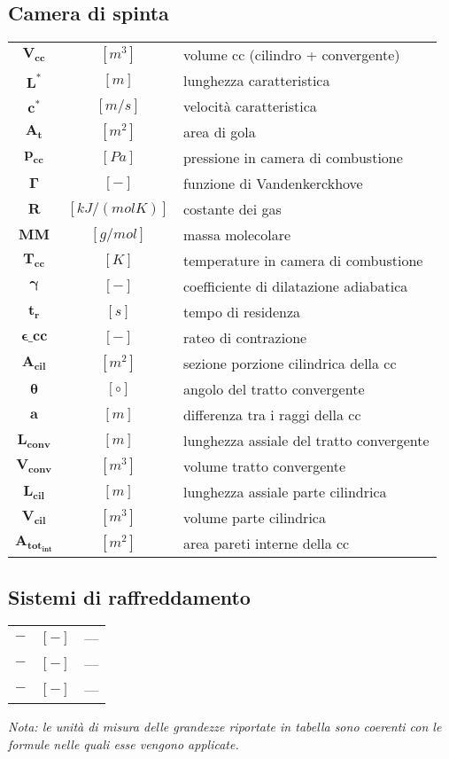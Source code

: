 \begin{multicols}{2}
	\subsection{Camera di spinta}
	\begin{tabular}{ccl}
		$\bm{V_{cc}  }$ & $[m^3]$ & volume cc (cilindro + convergente) \\
		$\bm{L^* }$ & $[m]$ & lunghezza caratteristica \\
		$\bm{c^* }$ & $[m/s]$ & velocità caratteristica \\
		$\bm{A_{t} }$ & $[m^2]$ & area di gola \\
	    $\bm{p_{cc} }$ & $[Pa]$ & pressione in camera di combustione \\
	    $\bm{\Gamma}$ & $[-]$ & funzione di Vandenkerckhove \\
		$\bm{R}$ & $[kJ/(molK)]$ & costante dei gas \\
	    $\bm{MM}$ & $[g/mol]$ & massa molecolare \\
	    $\bm{T_{cc} }$ & $[K]$ & temperature in camera di combustione \\
		$\bm{\gamma}$ & $[-]$ & coefficiente di dilatazione adiabatica \\
	    $\bm{t_{r} }$ & $[s]$ & tempo di residenza \\
	    $\bm{\epsilon\_{cc} }$ & $[-]$ & rateo di contrazione             \\
		$\bm{A_{cil} }$ & $[m^2]$ & sezione porzione cilindrica della cc \\
	    $\bm{\theta}$ & $[\circ]$ & angolo del tratto convergente   \\
	    $\bm{a}$ & $[m]$ & differenza tra i raggi della cc \\
		$\bm{L_{conv}}$ & $[m]$ & lunghezza assiale del tratto convergente \\
	    $\bm{V_{conv} }$ & $[m^3]$ & volume tratto convergente  \\
	    $\bm{L_{cil} }$ & $[m]$ & lunghezza assiale parte cilindrica \\
		$\bm{V_{cil} }$ & $[m^3]$ & volume parte cilindrica \\
	    $\bm{A_{tot_{int}}}$ & $[m^2]$ & area pareti interne della cc 
	\end{tabular}

	\subsection{Sistemi di raffreddamento}
	\begin{tabular}{ccl}
		$\bm{-}$ & $[-]$ & --- \\
		$\bm{-}$ & $[-]$ & --- \\
		$\bm{-}$ & $[-]$ & ---
	\end{tabular}

\end{multicols}

\textit{Nota: le unità di misura delle grandezze riportate in tabella sono coerenti con le formule nelle quali esse vengono applicate.}
